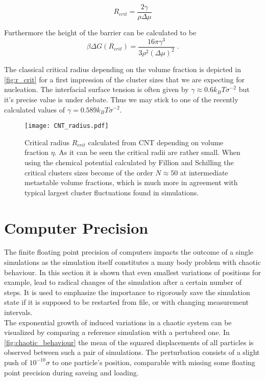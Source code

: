 \begin{equation}
\label{eqn:r_crit}
R_{crit} = \frac{2 \gamma}{\rho \Delta \mu }
\end{equation}

Furthermore the height of the barrier can be calculated to be 
\begin{equation}
\beta \Delta G (R_{crit}) = \frac{16 \pi \gamma^3}{3 \rho^2 (\Delta \mu )^2} \; \text{.}
\end{equation}

The classical critical radius depending on the volume fraction is depicted in \autoref{fig:r_crit} for a first impression of the cluster sizes that we are expecting for nucleation. The interfacial surface tension is often given by $\gamma \approx 0.6 k_B T \sigma^{-2}$ but it's precise value is under debate. Thus we may stick to one of the recently calculated values of $\gamma = 0.589 k_B T \sigma^{-2}$\cite{Bultmann2020}. 
\begin{figure}[h]
\centering
\texttt{[image: CNT\_radius.pdf]}
\caption[Critical radius in the metastable regime]{Critical radius $R_{crit}$ calculated from CNT depending on volume fraction $\eta$. As it can be seen the critical radii are rather small. When using the chemical potential calculated by Fillion and Schilling the critical clusters sizes become of the order $N \approx 50$ at intermediate metastable volume fractions, which is much more in agreement with typical largest cluster fluctuations found in simulations. }
\label{fig:r_crit}
\end{figure}

\section{Computer Precision}
\label{sec:precision}
The finite floating point precision of computers impacts the outcome of a single simulations as the simulation itself constitutes a many body problem with chaotic behaviour. In this section it is shown that even smallest variations of positions for example, lead to radical changes of the simulation after a certain number of steps. It is used to emphasize the importance to rigorously save the simulation state if it is supposed to be restarted from file, or with changing measurement intervals.\\

The exponential growth of induced variations in a chaotic system can be visualized by comparing a reference simulation with a pertubred one. In \autoref{fig:chaotic_behaviour} the mean of the squared displacements of all particles is observed between such a pair of simulations. The perturbation consists of a slight push of $10^{-10} \sigma$ to one particle's position, comparable with missing some floating point precision during saveing and loading.\\


